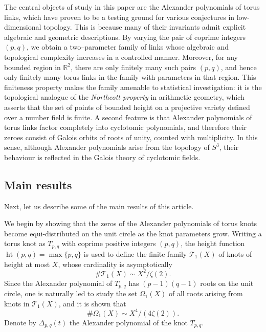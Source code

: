 \documentclass[table]{amsart}
\numberwithin{equation}{section}
\begin{document}
\par The central objects of study in this paper are the Alexander polynomials of torus links, which have proven to be a testing ground for various conjectures in low-dimensional topology. This is because many of their invariants admit explicit algebraic and geometric descriptions. By varying the pair of coprime integers \((p,q)\), we obtain a two--parameter family of links whose algebraic and topological complexity increases in a controlled manner. Moreover, for any bounded region in \(\mathbb{R}^2\), there are only finitely many such pairs \((p,q)\), and hence only finitely many torus links in the family with parameters in that region. This finiteness property makes the family amenable to statistical investigation: it is the topological analogue of the \emph{Northcott property} in arithmetic geometry, which asserts that the set of points of bounded height on a projective variety defined over a number field is finite. A second feature is that Alexander polynomials of torus links factor completely into cyclotomic polynomials, and therefore their zeroes consist of Galois orbits of roots of unity, counted with multiplicity. In this sense, although Alexander polynomials arise from the topology of \(S^3\), their behaviour is reflected in the Galois theory of cyclotomic fields. 
\subsection{Main results}
\par Next, let us describe some of the main results of this article. 
\par We begin by showing that the zeros of the Alexander polynomials of torus knots become equi-distributed on the unit circle as the knot parameters grow. Writing a torus knot as $T_{p,q}$ with coprime positive integers $(p,q)$, the height function $\operatorname{ht}(p,q)=\max\{p,q\}$ is used to define the finite family $\mathcal{T}_1(X)$ of knots of height at most $X$, whose cardinality is asymptotically \[\#\mathcal{T}_1(X)\sim X^2/\zeta(2).\] Since the Alexander polynomial of $T_{p,q}$ has $(p-1)(q-1)$ roots on the unit circle, one is naturally led to study the set $\Omega_1(X)$ of all roots arising from knots in $\mathcal{T}_1(X)$, and it is shown that \[\#\Omega_1(X)\sim X^4/(4\zeta(2)).\] Denote by $\Delta_{p,q}(t)$ the Alexander polynomial of the knot $T_{p,q}$.
\end{document}
